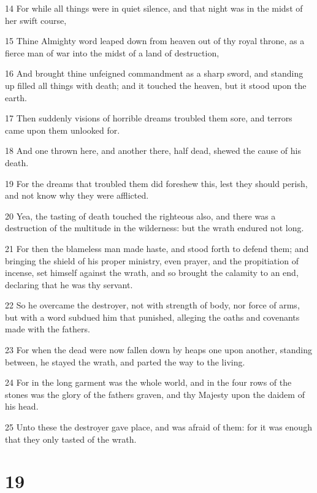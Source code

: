 \par 14 For while all things were in quiet silence, and that night was in the midst of her swift course,
\par 15 Thine Almighty word leaped down from heaven out of thy royal throne, as a fierce man of war into the midst of a land of destruction,
\par 16 And brought thine unfeigned commandment as a sharp sword, and standing up filled all things with death; and it touched the heaven, but it stood upon the earth.
\par 17 Then suddenly visions of horrible dreams troubled them sore, and terrors came upon them unlooked for.
\par 18 And one thrown here, and another there, half dead, shewed the cause of his death.
\par 19 For the dreams that troubled them did foreshew this, lest they should perish, and not know why they were afflicted.
\par 20 Yea, the tasting of death touched the righteous also, and there was a destruction of the multitude in the wilderness: but the wrath endured not long.
\par 21 For then the blameless man made haste, and stood forth to defend them; and bringing the shield of his proper ministry, even prayer, and the propitiation of incense, set himself against the wrath, and so brought the calamity to an end, declaring that he was thy servant.
\par 22 So he overcame the destroyer, not with strength of body, nor force of arms, but with a word subdued him that punished, alleging the oaths and covenants made with the fathers.
\par 23 For when the dead were now fallen down by heaps one upon another, standing between, he stayed the wrath, and parted the way to the living.
\par 24 For in the long garment was the whole world, and in the four rows of the stones was the glory of the fathers graven, and thy Majesty upon the daidem of his head.
\par 25 Unto these the destroyer gave place, and was afraid of them: for it was enough that they only tasted of the wrath.

\chapter{19}

